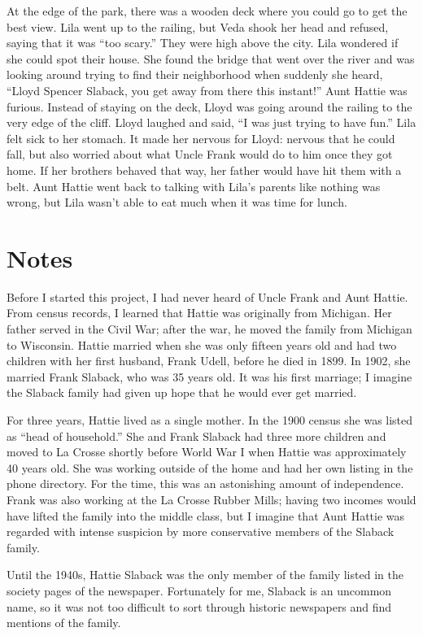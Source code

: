 \documentclass[
  american,
  letterpaper,
]{book}
\begin{document}
At the edge of the park, there was a wooden deck where you could go to
get the best view. Lila went up to the railing, but Veda shook her head
and refused, saying that it was ``too scary.'' They were high above the
city. Lila wondered if she could spot their house. She found the bridge
that went over the river and was looking around trying to find their
neighborhood when suddenly she heard, ``Lloyd Spencer Slaback, you get
away from there this instant!'' Aunt Hattie was furious. Instead of
staying on the deck, Lloyd was going around the railing to the very edge
of the cliff. Lloyd laughed and said, ``I was just trying to have fun.''
Lila felt sick to her stomach. It made her nervous for Lloyd: nervous
that he could fall, but also worried about what Uncle Frank would do to
him once they got home. If her brothers behaved that way, her father
would have hit them with a belt. Aunt Hattie went back to talking with
Lila's parents like nothing was wrong, but Lila wasn't able to eat much
when it was time for lunch.

\section{Notes}\label{notes-4}

Before I started this project, I had never heard of Uncle Frank and Aunt
Hattie. From census records, I learned that Hattie was originally from
Michigan. Her father served in the Civil War; after the war, he moved
the family from Michigan to Wisconsin. Hattie married when she was only
fifteen years old and had two children with her first husband, Frank
Udell, before he died in 1899. In 1902, she married Frank Slaback, who
was 35 years old. It was his first marriage; I imagine the Slaback
family had given up hope that he would ever get married.

For three years, Hattie lived as a single mother. In the 1900 census she
was listed as ``head of household.'' She and Frank Slaback had three
more children and moved to La Crosse shortly before World War I when
Hattie was approximately 40 years old. She was working outside of the
home and had her own listing in the phone directory. For the time, this
was an astonishing amount of independence. Frank was also working at the
La Crosse Rubber Mills; having two incomes would have lifted the family
into the middle class, but I imagine that Aunt Hattie was regarded with
intense suspicion by more conservative members of the Slaback family.

Until the 1940s, Hattie Slaback was the only member of the family listed
in the society pages of the newspaper. Fortunately for me, Slaback is an
uncommon name, so it was not too difficult to sort through historic
newspapers and find mentions of the family.
\end{document}
